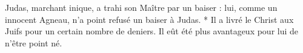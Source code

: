 Judas, marchant inique, a trahi son Maître par un baiser : lui, comme un innocent Agneau, n’a point refusé un baiser à Judas. * Il a livré le Christ aux Juifs pour un certain nombre de deniers.
\versseparator
Il eût été plus avantageux pour lui de n’être point né.
